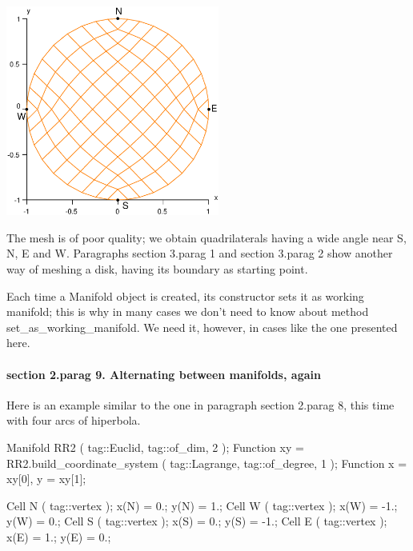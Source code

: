 { 
\centerline{\includegraphics[width=70mm]{disk.eps}} }

The mesh is of poor quality; we obtain quadrilaterals having a wide angle near {\codett S},
{\codett N}, {\codett E} and {\codett W}.
Paragraphs \numb section 3.\numb parag 1 and \numb section 3.\numb parag 2 show another way
of meshing a disk, having its boundary as starting point.

Each time a {\codett Manifold} object is created, its constructor sets it as working manifold;
this is why in many cases we don't need to know about method {\codett set\_as\_working\_manifold}.
We need it, however, in cases like the one presented here.
\vfil\eject


\paragraph{\numb section 2.\numb parag 9. Alternating between manifolds, again}

Here is an example similar to the one in paragraph \numb section 2.\numb parag 8,
this time with four arcs of hiperbola.

\verbatim
   Manifold RR2 ( tag::Euclid, tag::of_dim, 2 );
   Function xy = RR2.build_coordinate_system ( tag::Lagrange, tag::of_degree, 1 );
   Function x = xy[0],  y = xy[1];

   Cell N ( tag::vertex );  x(N) =  0.;   y(N) =  1.;
   Cell W ( tag::vertex );  x(W) = -1.;   y(W) =  0.;
   Cell S ( tag::vertex );  x(S) =  0.;   y(S) = -1.;
   Cell E ( tag::vertex );  x(E) =  1.;   y(E) =  0.;

